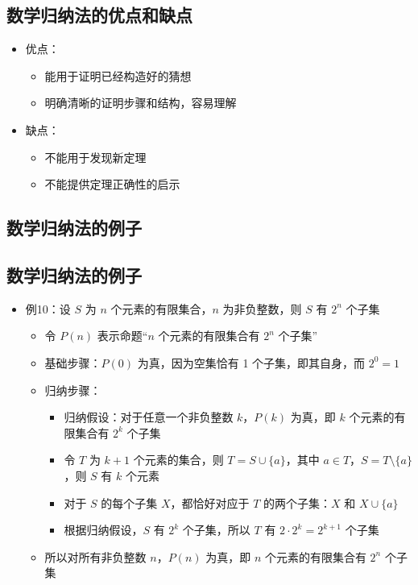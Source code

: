 \documentclass[UTF8]{report}
\theoremstyle{MyLineTheoremStyle} %
\theoremstyle{MyBlockTheoremStyle} %
\theoremstyle{MySubsubsectionStyle} %
\begin{document}
\subsection{数学归纳法的优点和缺点}
\begin{itemize}
    \item 优点：
    \begin{itemize}
        \item 能用于证明已经构造好的猜想
        \item 明确清晰的证明步骤和结构，容易理解
    \end{itemize}
    \item 缺点：
    \begin{itemize}
        \item 不能用于发现新定理
        \item 不能提供定理正确性的启示
    \end{itemize}
\end{itemize}

\subsection{数学归纳法的例子}
\subsection{数学归纳法的例子}
\begin{itemize}
    \item 例10：设 $S$ 为 $n$ 个元素的有限集合，$n$ 为非负整数，则 $S$ 有 $2^n$ 个子集
    \begin{itemize}
        \item 令 $P(n)$ 表示命题“$n$ 个元素的有限集合有 $2^n$ 个子集”
        \item 基础步骤：$P(0)$ 为真，因为空集恰有 1 个子集，即其自身，而 $2^0 = 1$
        \item 归纳步骤：
        \begin{itemize}
            \item 归纳假设：对于任意一个非负整数 $k$，$P(k)$ 为真，即 $k$ 个元素的有限集合有 $2^k$ 个子集
            \item 令 $T$ 为 $k+1$ 个元素的集合，则 $T = S \cup \{a\}$，其中 $a \in T$，$S = T \setminus \{a\}$，则 $S$ 有 $k$ 个元素
            \item 对于 $S$ 的每个子集 $X$，都恰好对应于 $T$ 的两个子集：$X$ 和 $X \cup \{a\}$
            \item 根据归纳假设，$S$ 有 $2^k$ 个子集，所以 $T$ 有 $2 \cdot 2^k = 2^{k+1}$ 个子集
        \end{itemize}
        \item 所以对所有非负整数 $n$，$P(n)$ 为真，即 $n$ 个元素的有限集合有 $2^n$ 个子集
    \end{itemize}
\end{itemize}
\end{document}

